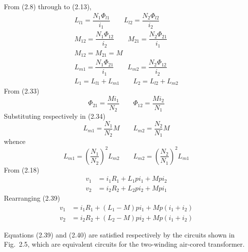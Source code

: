 \documentclass[a4paper,numbers=noenddot,12pt]{scrbook}
\begin{document}
From (2.8) through to (2.13),
\begin{gather}
    L_{l1} = \dfrac{N_1 \Phi_{l1}}{i_1} \qquad L_{l2} = \dfrac{N_2 \Phi_{l2}}{i_2}\\
    M_{12} = \dfrac{N_1 \Phi_{12}}{i_2} \qquad M_{21} = \dfrac{N_2 \Phi_{21}}{i_1}\\
    M_{12} = M_{21} = M \nonumber\\
    L_{m1} = \dfrac{N_1 \Phi_{21}}{i_1} \qquad L_{m2} = \dfrac{N_2 \Phi_{12}}{i_2}\\
    L_1 = L_{l1} + L_{m1} \qquad L_2 = L_{l2} + L_{m2}
\end{gather}
From (2.33)
\begin{equation}
    \Phi_{21} = \dfrac{M i_{1}}{N_2} \qquad \Phi_{12} = \dfrac{M i_{2}}{N_1}
    \label{eq:Eq2.36}
\end{equation}
Substituting respectively in (2.34)
\begin{equation}
    L_{m1} = \dfrac{N_1}{N_2} M \qquad L_{m2} = \dfrac{N_2}{N_1} M
    \label{eq:Eq2.37}
\end{equation}
whence
\begin{equation}
    L_{m1} = {\left( \dfrac{N_1}{N_2}\right)}^2 L_{m2} \qquad L_{m2} = {\left( \dfrac{N_2}{N_1}\right)}^2 L_{m1}
    \label{eq:Eq2.38}
\end{equation}
From (2.18)
\begin{equation}
    \begin{aligned}
        v_1 & = i_1 R_1 + L_1 p i_1 + M p i_2 \\
        v_2 & = i_2 R_2 + L_2 p i_2 + M p i_1
    \end{aligned}
    \label{eq:Eq2.39}
\end{equation}
Rearranging (2.39)
\begin{equation}
    \begin{aligned}
        v_1 & = i_1 R_1 + (L_1 - M) p i_1 + M p (i_1 + i_2) \\
        v_2 & = i_2 R_2 + (L_2 - M) p i_2 + M p (i_1 + i_2)
    \end{aligned}
    \label{eq:Eq2.40}
\end{equation}

Equations (2.39) and (2.40) are satisfied respectively by the circuits shown in Fig.\ 2.5, which are equivalent circuits for the two-winding air-cored transformer.
\end{document}
